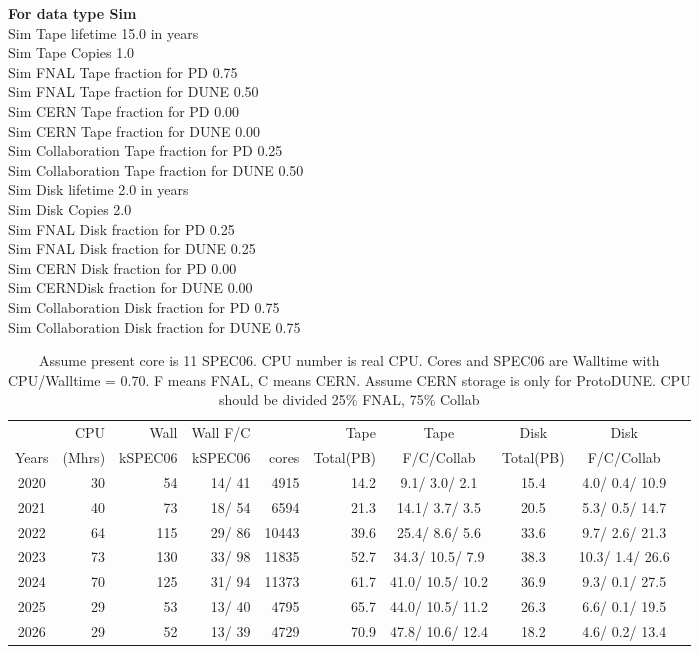 \documentclass[12pt]{article}
\begin{document}
{\bf For data type Sim}\\
   Sim Tape lifetime  15.0 in years\\
   Sim Tape Copies   1.0\\
   Sim FNAL Tape fraction for PD  0.75\\
   Sim FNAL Tape fraction for DUNE  0.50\\
   Sim CERN Tape fraction for PD  0.00\\
   Sim CERN Tape fraction for DUNE  0.00\\
   Sim Collaboration Tape fraction for PD  0.25\\
   Sim Collaboration Tape fraction for DUNE  0.50\\
   Sim Disk lifetime   2.0 in years\\
   Sim Disk Copies   2.0\\
   Sim FNAL Disk fraction for PD  0.25\\
   Sim FNAL Disk fraction for DUNE  0.25\\
   Sim CERN Disk fraction for PD  0.00\\
   Sim CERNDisk fraction for DUNE  0.00\\
   Sim Collaboration Disk fraction for PD  0.75\\
   Sim Collaboration Disk fraction for DUNE  0.75\\
\begin{table}
\footnotesize
 \centering \begin{tabular}[h]{crrrrrcccc}
 & CPU &Wall&Wall F/C&\qquad  & Tape\qquad& Tape\qquad  & Disk\qquad  & Disk\qquad \\
Years&(Mhrs)&kSPEC06&kSPEC06&cores& Total(PB)&F/C/Collab & Total(PB) &F/C/Collab\\
\hline
2020&	  30&	  54&	  14/  41&	  4915&	     14.2&	   9.1/  3.0/  2.1&	     15.4&	   4.0/  0.4/ 10.9\\
2021&	  40&	  73&	  18/  54&	  6594&	     21.3&	  14.1/  3.7/  3.5&	     20.5&	   5.3/  0.5/ 14.7\\
2022&	  64&	 115&	  29/  86&	 10443&	     39.6&	  25.4/  8.6/  5.6&	     33.6&	   9.7/  2.6/ 21.3\\
2023&	  73&	 130&	  33/  98&	 11835&	     52.7&	  34.3/ 10.5/  7.9&	     38.3&	  10.3/  1.4/ 26.6\\
2024&	  70&	 125&	  31/  94&	 11373&	     61.7&	  41.0/ 10.5/ 10.2&	     36.9&	   9.3/  0.1/ 27.5\\
2025&	  29&	  53&	  13/  40&	  4795&	     65.7&	  44.0/ 10.5/ 11.2&	     26.3&	   6.6/  0.1/ 19.5\\
2026&	  29&	  52&	  13/  39&	  4729&	     70.9&	  47.8/ 10.6/ 12.4&	     18.2&	   4.6/  0.2/ 13.4\\
\end{tabular}
\caption{Assume present core is   11 SPEC06. CPU number is real CPU. Cores and SPEC06 are Walltime with CPU/Walltime =  0.70.  F means FNAL, C means CERN. Assume CERN storage is only  for ProtoDUNE. CPU should be divided 25\% FNAL, 75\% Collab}\normalsize
 \end{table}
\end{document}
